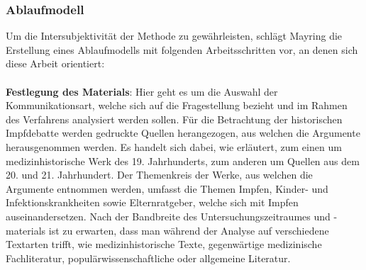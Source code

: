 \documentclass[
    a4paper,
    12pt,
    hyphens,
    chapterprefix=true,
    headheight=33pt,
    footheight=29pt,
    headings=optiontohead, %
]{scrartcl}
\begin{document}
\subsubsection{Ablaufmodell}
Um die Intersubjektivität der Methode zu gewährleisten, schlägt Mayring die Erstellung eines Ablaufmodells mit folgenden Arbeitsschritten vor, an denen sich diese Arbeit orientiert:\\
\\
\textbf{Festlegung des Materials}: Hier geht es um die Auswahl der Kommunikationsart, welche sich auf die Fragestellung bezieht und im Rahmen des Verfahrens analysiert werden sollen. Für die Betrachtung der historischen Impfdebatte werden gedruckte Quellen herangezogen, aus welchen die Argumente herausgenommen werden. Es handelt sich dabei, wie erläutert, zum einen um medizinhistorische Werk des 19. Jahrhunderts, zum anderen um Quellen aus dem 20. und 21. Jahrhundert. Der Themenkreis der Werke, aus welchen die Argumente entnommen werden, umfasst die Themen Impfen, Kinder- und Infektionskrankheiten sowie Elternratgeber, welche sich mit Impfen auseinandersetzen. Nach der Bandbreite des Untersuchungszeitraumes und -materials ist zu erwarten, dass man während der Analyse auf verschiedene Textarten trifft, wie medizinhistorische Texte, gegenwärtige medizinische Fachliteratur, populärwissenschaftliche oder allgemeine Literatur.\\
\end{document}

